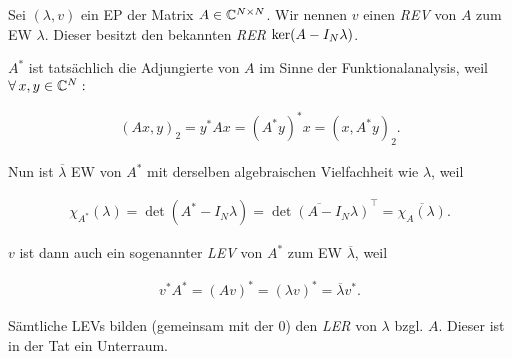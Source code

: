 \begin{remark}
    
    Sei $(\lambda, v)$ ein EP der Matrix $A \in \mathbb{C}^{N \times N}$.
    Wir nennen $v$ einen \textit{REV} von $A$ zum EW $\lambda$.
    Dieser besitzt den bekannten \textit{RER} $\operatorname{ker}(A - I_N \lambda)$.

    $A^\ast$ ist tatsächlich die Adjungierte von $A$ im Sinne der Funktionalanalysis, weil $\forall \, x, y \in \mathbb{C}^N:$

    \begin{align*}
        (A x, y)_2
        =
        y^\ast A x
        =
        (A^\ast y)^\ast x
        =
        (x, A^\ast y)_2.
    \end{align*}

    Nun ist $\overline \lambda$ EW von $A^\ast$ mit derselben algebraischen Vielfachheit wie $\lambda$, weil

    \begin{align*}
        \chi_{A^\ast}(\lambda)
        =
        \det(A^\ast - I_N \lambda)
        =
        \overline{\det(A - I_N \lambda)}^\top
        =
        \overline{\chi_A(\lambda)}.
    \end{align*}

    $v$ ist dann auch ein sogenannter \textit{LEV} von $A^\ast$ zum EW $\overline \lambda$, weil

    \begin{align*}
        v^\ast A^\ast
        =
        (A v)^\ast
        =
        (\lambda v)^\ast
        =
        \overline \lambda v^\ast.
    \end{align*}

    Sämtliche LEVs bilden (gemeinsam mit der $0$) den \textit{LER} von $\lambda$ bzgl. $A$.
    Dieser ist in der Tat ein Unterraum.

\end{remark}

